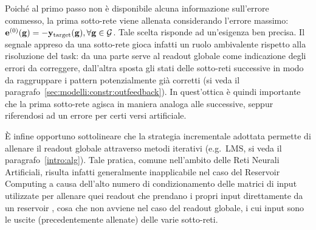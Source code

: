 Poiché al primo passo non è disponibile alcuna informazione sull'errore commesso, la prima sotto-rete viene allenata considerando l'errore massimo:  $\mathbf{e}^{(0)}(\mathbf{g}) = -\mathbf{y}_\textup{target}(\mathbf{g}), \forall \mathbf{g} \in \mathcal{G}$. Tale scelta risponde ad un'esigenza ben precisa. Il segnale appreso da una sotto-rete gioca infatti un ruolo ambivalente rispetto alla risoluzione del task: da una parte serve al readout globale come indicazione degli errori da correggere, dall'altra sposta gli stati delle sotto-reti successive in modo da raggruppare i pattern potenzialmente già corretti (si veda il paragrafo~\ref{sec:modelli:constr:outfeedback}). In quest'ottica è quindi importante che la prima sotto-rete agisca in maniera analoga alle successive, seppur riferendosi ad un errore per certi versi artificiale.

\`E infine opportuno sottolineare che la strategia incrementale adottata permette di allenare il readout globale attraverso metodi iterativi (e.g.\ LMS, si veda il paragrafo~\ref{intro:alg}). Tale pratica, comune nell'ambito delle Reti Neurali Artificiali, risulta infatti generalmente inapplicabile nel caso del Reservoir Computing a causa dell'alto numero di condizionamento delle matrici di input utilizzate per allenare quei readout che prendano i propri input direttamente da un reservoir \cite{Jaeger:ReservoirRiddles}, cosa che non avviene nel caso del readout globale, i cui input sono le uscite (precedentemente allenate) delle varie sotto-reti.



